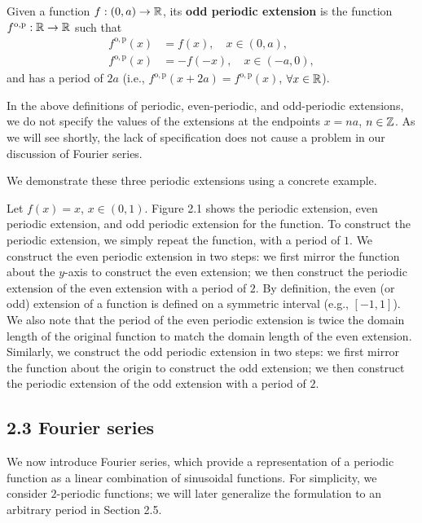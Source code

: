 \begin{definition}
    Given a function $f : (0, a) \to \mathbb{R}$, its \textbf{odd periodic extension} is the function $f^{\mathrm{o,p}} : \mathbb{R} \to \mathbb{R}$ such that
    \begin{align*}
        f^{\mathrm{o,p}}(x) &= f(x), \quad x \in (0, a), \\
        f^{\mathrm{o,p}}(x) &= -f(-x), \quad x \in (-a, 0),
    \end{align*}
    and has a period of $2a$ (i.e., $f^{\mathrm{o,p}}(x + 2a) = f^{\mathrm{o,p}}(x)$, $\forall x \in \mathbb{R}$).
\end{definition}

In the above definitions of periodic, even-periodic, and odd-periodic extensions, we do not specify the values of the extensions at the endpoints $x = na$, $n \in \mathbb{Z}$. As we will see shortly, the lack of specification does not cause a problem in our discussion of Fourier series.

We demonstrate these three periodic extensions using a concrete example.

\begin{example}
    Let $f(x) = x$, $x \in (0, 1)$. Figure 2.1 shows the periodic extension, even periodic extension, and odd periodic extension for the function. To construct the periodic extension, we simply repeat the function, with a period of $1$. We construct the even periodic extension in two steps: we first mirror the function about the $y$-axis to construct the even extension; we then construct the periodic extension of the even extension with a period of $2$. By definition, the even (or odd) extension of a function is defined on a symmetric interval (e.g., $[-1, 1]$). We also note that the period of the even periodic extension is twice the domain length of the original function to match the domain length of the even extension. Similarly, we construct the odd periodic extension in two steps: we first mirror the function about the origin to construct the odd extension; we then construct the periodic extension of the odd extension with a period of $2$.
\end{example}


\subsection{2.3 Fourier series}
We now introduce Fourier series, which provide a representation of a periodic function as a linear combination of sinusoidal functions. For simplicity, we consider $2$-periodic functions; we will later generalize the formulation to an arbitrary period in Section 2.5.


